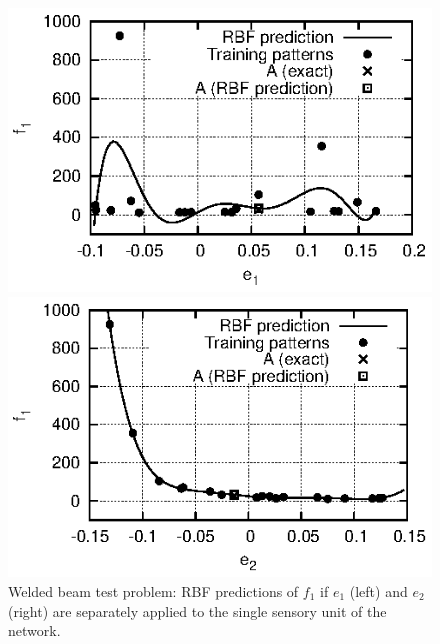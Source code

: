 \begin{figure}
\begin{minipage}{0.48\textwidth}
\includegraphics[scale=1.2]{IPE/f1_e1.eps}
\end{minipage}
\begin{minipage}{0.48\textwidth}
\includegraphics[scale=1.2]{IPE/f1_e2.eps}
\end{minipage}
\caption{Welded beam test problem: RBF predictions of $f_1$ if $e_1$ (left) and $e_2$ (right) are separately applied to the single sensory unit of the network.}
\label{fig:f1e1e2}
\end{figure}

